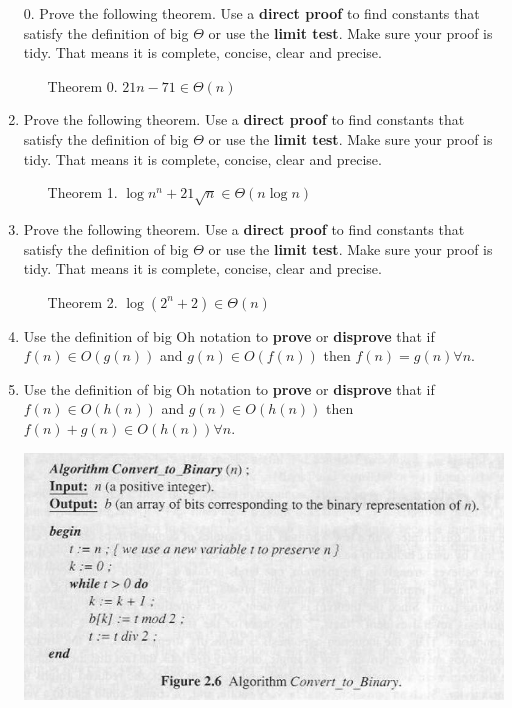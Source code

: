 \documentclass[12pt]{article}
\begin{document}
\begin{enumerate}
\item[0. ] Prove the following theorem. Use a \textbf{direct proof} to find constants 
that satisfy the definition of big $\Theta$ or use the \textbf{limit test}. Make sure your 
proof is tidy. That means it is complete, concise, clear and precise.
\begin{enumerate}
\item[Theorem 0.] $21n - 71 \in \Theta(n)$
\end{enumerate}
\newpage
\item Prove the following theorem. Use a \textbf{direct proof} to find constants 
that satisfy the definition of big $\Theta$ or use the \textbf{limit test}. Make sure your 
proof is tidy. That means it is complete, concise, clear and precise.
\begin{enumerate}
\item[Theorem 1.] $\log{n^n} + 21 \sqrt{n} \in \Theta(n\log{n})$
\end{enumerate}
\newpage
\item Prove the following theorem. Use a \textbf{direct proof} to find constants 
that satisfy the definition of big $\Theta$ or use the \textbf{limit test}. Make sure your 
proof is tidy. That means it is complete, concise, clear and precise.
\begin{enumerate}
\item[Theorem 2.] $\log{(2^n+2)} \in \Theta(n)$
\end{enumerate}
\newpage
\item Use the definition of big Oh notation to \textbf{prove} or \textbf{disprove} that if $f(n) \in O(g(n)) $ and $g(n) \in O(f(n))$ then $f(n) = g(n) \forall n$.
\newpage
\item Use the definition of big Oh notation to \textbf{prove} or \textbf{disprove} that if $f(n) \in O(h(n)) $ and $g(n) \in O(h(n))$ then $f(n) + g(n) \in O(h(n)) \forall n$.
\newpage
\centerline{\includegraphics[scale = 0.6]{algo.jpg}}

\end{enumerate}
\end{document}
